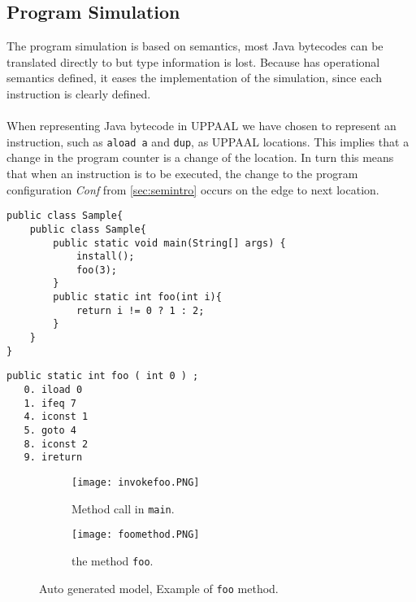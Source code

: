 \subsection{Program Simulation}

The program simulation is based on \jcl semantics, most Java bytecodes can be translated directly to \jcl but type information is lost. Because \jcl has operational semantics defined, it eases the implementation of the simulation, since each instruction is clearly defined.\\\\
When representing Java bytecode in UPPAAL we have chosen to represent an instruction, such as \texttt{aload a} and \texttt{dup}, as UPPAAL locations. 
This implies that a change in the program counter is a change of the location. 
In turn this means that when an instruction is to be executed, the change to the program configuration \textit{Conf} from  \cref{sec:semintro} occurs on the edge to next location.

\begin{minipage}{\linewidth}
\begin{lstlisting}[caption=Java code sample.]
public class Sample{
    public class Sample{
        public static void main(String[] args) {
            install();
            foo(3);
        }
        public static int foo(int i){
            return i != 0 ? 1 : 2;
        }
    }
}
\end{lstlisting}
\end{minipage}
\begin{minipage}{\linewidth}
\begin{lstlisting}[caption=Bytecode sample.]
public static int foo ( int 0 ) ;
   0. iload 0
   1. ifeq 7
   4. iconst 1
   5. goto 4
   8. iconst 2
   9. ireturn
\end{lstlisting}
\end{minipage}

\begin{figure}
\begin{subfigure}{\textwidth}
	\texttt{[image: invokefoo.PNG]}
	\caption{Method call in \texttt{main}.}
\end{subfigure}
\begin{subfigure}{\textwidth}
	\texttt{[image: foomethod.PNG]}
	\caption{the method \texttt{foo}.}
	\label{fig:uppaal3}
\end{subfigure}

\caption{Auto generated model, Example of \texttt{foo} method.}
\label{fig:fooMethod}
\end{figure}


